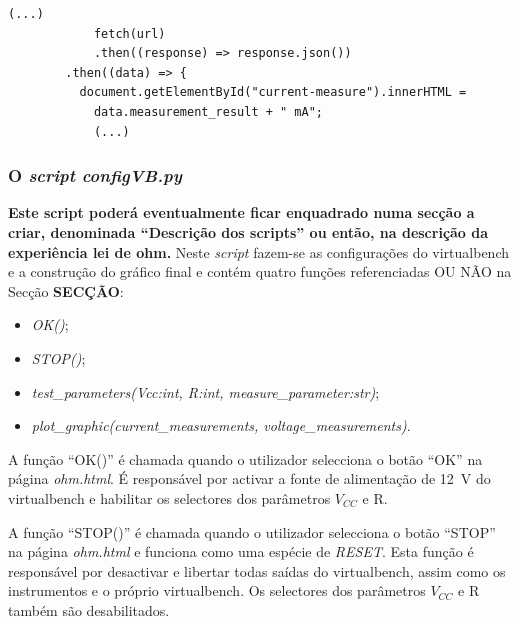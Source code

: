 \begin{center}
	\begin{minipage}{0.7\linewidth}
		\begin{lstlisting}[language=html, caption=Recepção de resultados na página \textit{ohm.html}, label=lst:recepcaoresultados]
			(...)
			fetch(url)
			.then((response) => response.json())
		.then((data) => {
		  document.getElementById("current-measure").innerHTML =
			data.measurement_result + " mA";
			(...)
			\end{lstlisting}
	\end{minipage}
\end{center}

\subsubsection{O \textit{script configVB.py}}
\textbf{Este script poderá eventualmente ficar enquadrado numa secção a criar, denominada ``Descrição dos scripts'' ou então, na descrição da experiência lei de ohm.}
Neste \textit{script} fazem-se as configurações do \acrshort{virtualbench} e a construção do gráfico final e contém quatro funções referenciadas OU NÃO na Secção \textbf{SECÇÃO}:
\begin{itemize}
	\item \textit{OK()};
	\item \textit{STOP()};
	\item \textit{test\_parameters(Vcc:int, R:int, measure\_parameter:str)};
	\item \textit{plot\_graphic(current\_measurements, voltage\_measurements)}.
\end{itemize}

A função ``OK()'' é chamada quando o utilizador selecciona o botão ``OK'' na página \textit{ohm.html}. É responsável por activar a fonte de alimentação de \SI{12}{\volt} do \acrshort{virtualbench} e habilitar os selectores dos parâmetros $V_{CC}$ e R.

A função ``STOP()'' é chamada quando o utilizador selecciona o botão ``STOP'' na página \textit{ohm.html} e funciona como uma espécie de \textit{RESET}. Esta função é responsável por desactivar e libertar todas saídas do \acrshort{virtualbench}, assim como os instrumentos e o próprio \acrshort{virtualbench}. Os selectores dos parâmetros $V_{CC}$ e R também são desabilitados.


